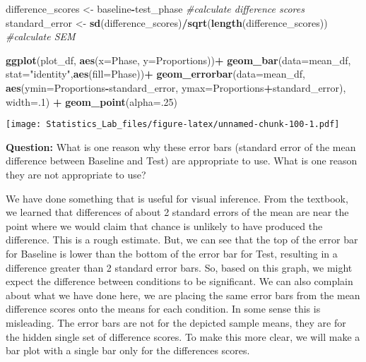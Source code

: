 \documentclass[
]{book}
\newenvironment{Shaded}{\begin{snugshade}}{\end{snugshade}}
\newcommand{\AttributeTok}[1]{\textcolor[rgb]{0.13,0.29,0.53}{#1}}
\newcommand{\CommentTok}[1]{\textcolor[rgb]{0.56,0.35,0.01}{\textit{#1}}}
\newcommand{\DecValTok}[1]{\textcolor[rgb]{0.00,0.00,0.81}{#1}}
\newcommand{\FunctionTok}[1]{\textcolor[rgb]{0.13,0.29,0.53}{\textbf{#1}}}
\newcommand{\NormalTok}[1]{#1}
\newcommand{\OtherTok}[1]{\textcolor[rgb]{0.56,0.35,0.01}{#1}}
\newcommand{\SpecialCharTok}[1]{\textcolor[rgb]{0.81,0.36,0.00}{\textbf{#1}}}
\newcommand{\StringTok}[1]{\textcolor[rgb]{0.31,0.60,0.02}{#1}}
\begin{document}
\begin{Shaded}
\begin{Highlighting}[]
\NormalTok{difference\_scores }\OtherTok{\textless{}{-}}\NormalTok{ baseline}\SpecialCharTok{{-}}\NormalTok{test\_phase }\CommentTok{\#calculate difference scores}
\NormalTok{standard\_error }\OtherTok{\textless{}{-}} \FunctionTok{sd}\NormalTok{(difference\_scores)}\SpecialCharTok{/}\FunctionTok{sqrt}\NormalTok{(}\FunctionTok{length}\NormalTok{(difference\_scores)) }\CommentTok{\#calculate SEM}


\FunctionTok{ggplot}\NormalTok{(plot\_df, }\FunctionTok{aes}\NormalTok{(}\AttributeTok{x=}\NormalTok{Phase, }\AttributeTok{y=}\NormalTok{Proportions))}\SpecialCharTok{+} 
  \FunctionTok{geom\_bar}\NormalTok{(}\AttributeTok{data=}\NormalTok{mean\_df, }\AttributeTok{stat=}\StringTok{"identity"}\NormalTok{,}\FunctionTok{aes}\NormalTok{(}\AttributeTok{fill=}\NormalTok{Phase))}\SpecialCharTok{+}
  \FunctionTok{geom\_errorbar}\NormalTok{(}\AttributeTok{data=}\NormalTok{mean\_df, }\FunctionTok{aes}\NormalTok{(}\AttributeTok{ymin=}\NormalTok{Proportions}\SpecialCharTok{{-}}\NormalTok{standard\_error, }
                                  \AttributeTok{ymax=}\NormalTok{Proportions}\SpecialCharTok{+}\NormalTok{standard\_error), }\AttributeTok{width=}\NormalTok{.}\DecValTok{1}\NormalTok{) }\SpecialCharTok{+}
  \FunctionTok{geom\_point}\NormalTok{(}\AttributeTok{alpha=}\NormalTok{.}\DecValTok{25}\NormalTok{)}
\end{Highlighting}
\end{Shaded}

\texttt{[image: Statistics\_Lab\_files/figure-latex/unnamed-chunk-100-1.pdf]}

\textbf{Question:} What is one reason why these error bars (standard error of the mean difference between Baseline and Test) are appropriate to use. What is one reason they are not appropriate to use?

We have done something that is useful for visual inference. From the textbook, we learned that differences of about 2 standard errors of the mean are near the point where we would claim that chance is unlikely to have produced the difference. This is a rough estimate. But, we can see that the top of the error bar for Baseline is lower than the bottom of the error bar for Test, resulting in a difference greater than 2 standard error bars. So, based on this graph, we might expect the difference between conditions to be significant. We can also complain about what we have done here, we are placing the same error bars from the mean difference scores onto the means for each condition. In some sense this is misleading. The error bars are not for the depicted sample means, they are for the hidden single set of difference scores. To make this more clear, we will make a bar plot with a single bar only for the differences scores.
\end{document}
